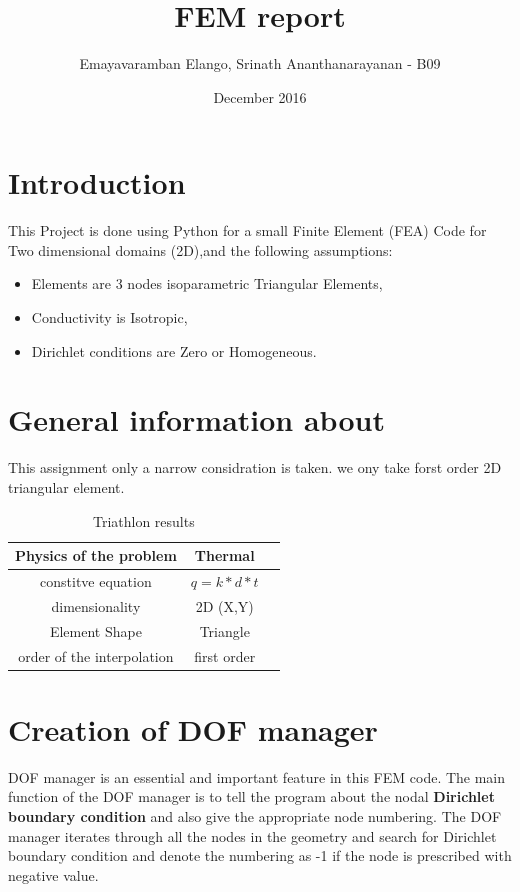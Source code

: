 \documentclass{article}
\title{FEM report}
\author{Emayavaramban Elango, Srinath Ananthanarayanan - B09 }
\date{December 2016}
\begin{document}
\maketitle
\tableofcontents{}

\section{Introduction}
This Project is done using Python for a small Finite Element (FEA) Code for Two dimensional domains (2D),and the following assumptions:
\begin{itemize}
\item Elements are 3 nodes isoparametric Triangular Elements,
\item Conductivity is Isotropic,
\item Dirichlet conditions are Zero or Homogeneous.
\end{itemize}

\section{General information about}

This assignment only a narrow considration is taken. we ony take forst order 2D triangular element. 


\begin{table}[h]
\centering
\begin{tabular}{ | c | c |  p{5cm}}
\hline
Physics of the problem &  Thermal \\

\hline
constitve equation & \( q = k * d * t \)\\
\hline
dimensionality & 2D  (X,Y)  \\ \hline
Element Shape & Triangle \\ \hline
order of the interpolation & first order \\ \hline








\end{tabular}
\caption{Triathlon results}
\label{tab:tri}
\end{table}



\section{Creation of DOF manager}


DOF manager is an essential and important feature in this FEM code. The main function of the DOF manager is to tell the program about the nodal \textbf{Dirichlet boundary condition} and also give the appropriate node numbering. The DOF manager iterates through all the nodes in the geometry and search for Dirichlet boundary condition and denote the numbering as -1 if the node is prescribed with negative value. 
\end{document}
